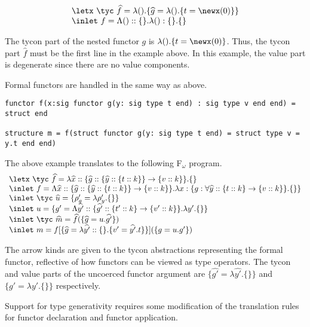\[ \begin{array}{l}
\letx~\tyc~\widehat{f} = \lambda().\{\widehat{g} = \lambda().\{ t =
\newx(0) \} \}\\
   \inlet~f = \Lambda()::\{\}.\lambda():\{\}.\{\}
\end{array}
\]

The tycon part of the nested functor $g$ is $\lambda().\{t =
\newx(0)\}$. Thus, the tycon part $\widehat{f}$ must be the first line in the
example above. In this example, the value part is degenerate since
there are no value components. 

Formal functors are handled in the same way as above. 

\begin{lstlisting}
functor f(x:sig functor g(y: sig type t end) : sig type v end end) =
struct end

structure m = f(struct functor g(y: sig type t end) = struct type v = y.t end end)
\end{lstlisting}

The above example translates to the following F$_\omega$ program.
\[\begin{array}{l}
\letx~\tyc~\widehat{f} = \lambda\widehat{x}::\{\widehat{g}::\{\widehat{y}::\{t :: k\}\}\to\{ v :: k \}\}.\{\}\\
\inlet~f = \Lambda\widehat{x}::\{ \widehat{g}::\{\widehat{y}::\{t :: k\}\}\to\{ v :: k \}
\}.\lambda x:\{ g : \forall\widehat{y}::\{ t ::
k \}\to \{ v :: k \}\}. \{\} \}\\
\inlet~\tyc~\widehat{u} = \{ \rho_g' = \lambda\rho_y'.\{ \} \}\\
\inlet~u = \{ g' = \Lambda \widehat{y'}::\{ \widehat{g'} :: \{ t'
:: k\} \to
\{ v' :: k\} \}.\lambda y'.\{ \} \}\\
\inlet~\tyc~\widehat{m} = \widehat{f}(\{\widehat{g} = u.\widehat{g'} \})\\
\inlet~m = f[\{ \widehat{g} = \lambda \widehat{y'} :: \{ \}  . \{ v' =
\widehat{y'}.t  \} \}](\{ g = u.g' \})
\end{array}\]

The arrow kinds are given to the tycon abstractions representing the formal functor, reflective of how functors can be viewed as type operators. 
The tycon and value parts
of the uncoerced functor argument are $\{\widehat{g'}=\lambda \widehat{y'}. \{
\}\}$ and
$\{g'=\lambda y'.\{\}\}$ respectively.  

Support for type generativity requires some modification of the
translation rules for functor declaration and functor application.

